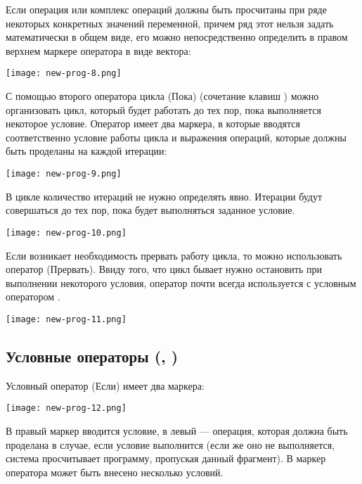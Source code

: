 Если операция или комплекс операций должны быть просчитаны при ряде некоторых конкретных значений переменной, причем ряд этот нельзя задать математически в общем виде, его можно непосредственно определить в правом верхнем маркере оператора  в виде вектора:
\begin{center}
	\texttt{[image: new-prog-8.png]}
\end{center}

С помощью второго оператора цикла  (Пока) (сочетание клавиш \keys{\ctrl+]} ) можно организовать цикл, который будет работать до тех пор, пока выполняется некоторое условие. Оператор  имеет два маркера, в которые вводятся соответственно условие работы цикла и выражения операций, которые должны быть проделаны на каждой итерации:
\begin{center}
	\texttt{[image: new-prog-9.png]}
\end{center}


В цикле  количество итераций не нужно определять явно. Итерации будут совершаться до тех пор, пока будет выполняться заданное условие.

\begin{center}
	\texttt{[image: new-prog-10.png]}
\end{center}

Если возникает необходимость прервать работу цикла, то можно использовать оператор  (Прервать). Ввиду того, что цикл бывает нужно остановить при выполнении некоторого условия, оператор  почти всегда используется с условным оператором .

\begin{center}
	\texttt{[image: new-prog-11.png]}
\end{center}


\subsection*{Условные операторы (, )}
Условный оператор  (Если) имеет два маркера:
\begin{center}
	\texttt{[image: new-prog-12.png]}
\end{center}
В правый маркер вводится условие, в левый --- операция, которая должна быть проделана в случае, если условие выполнится (если же оно не выполняется, система просчитывает программу, пропуская данный фрагмент). В маркер оператора может быть внесено несколько условий.

